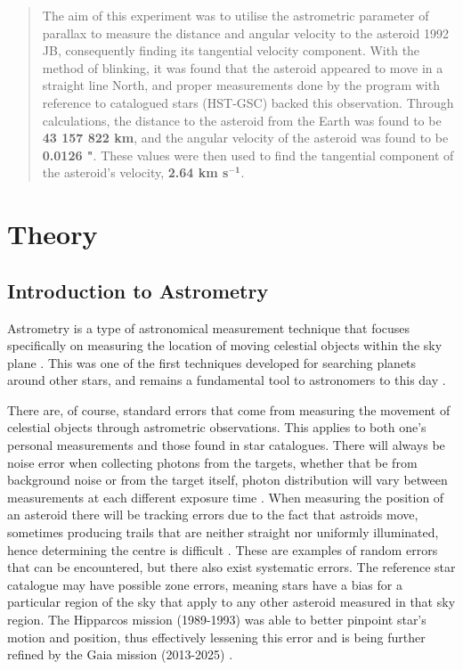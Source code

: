 \documentclass[12pt]{article}
\begin{document}
\begin{abstract}
\thispagestyle{empty}

The aim of this experiment was to utilise the astrometric parameter of parallax to measure the distance and angular velocity to the asteroid 1992 JB, consequently finding its tangential velocity component.
With the method of blinking, it was found that the asteroid appeared to move in a straight line North, and proper measurements done by the program with reference to catalogued stars (HST-GSC) backed this observation.
Through calculations, the distance to the asteroid from the Earth was found to be \textbf{43 157 822 km}, and the angular velocity of the asteroid was found to be \textbf{0.0126 "}. These values were then used to find the tangential component of the asteroid's
velocity, \textbf{2.64 km s}$\mathbf{^{-1}}$.
 
\end{abstract}
\newpage


\setcounter{page}{1}
\section{Theory} \label{sec:1}

\subsection{Introduction to Astrometry}

Astrometry is a type of astronomical measurement technique that focuses specifically on measuring the location of moving celestial objects within the sky plane \cite{ENDL2007887}.
This was one of the first techniques developed for searching planets around other stars, and remains a fundamental tool to astronomers to this day \cite{UCDastrometry,ENDL2007887}.

There are, of course, standard errors that come from measuring the movement of celestial objects through astrometric observations. This applies to both one's personal measurements and those found in star catalogues.
There will always be noise error when collecting photons from the targets, whether that be from background noise or from the target itself, photon distribution will vary between measurements at each different exposure time \cite{owen2000error}.
When measuring the position of an asteroid there will be tracking errors due to the fact that astroids move, sometimes producing trails that are neither straight nor uniformly illuminated, hence determining the centre is difficult \cite{owen2000error}.
These are examples of random errors that can be encountered, but there also exist systematic errors. The reference star catalogue may have possible zone errors, meaning stars have a bias for a particular region
of the sky that apply to any other asteroid measured in that sky region. The Hipparcos mission (1989-1993) was able to better pinpoint star's motion and position, thus effectively lessening this error \cite{owen2000error} and is being further
refined by the Gaia mission (2013-2025) \cite{hipparcos,gaiaesa}.
\end{document}
